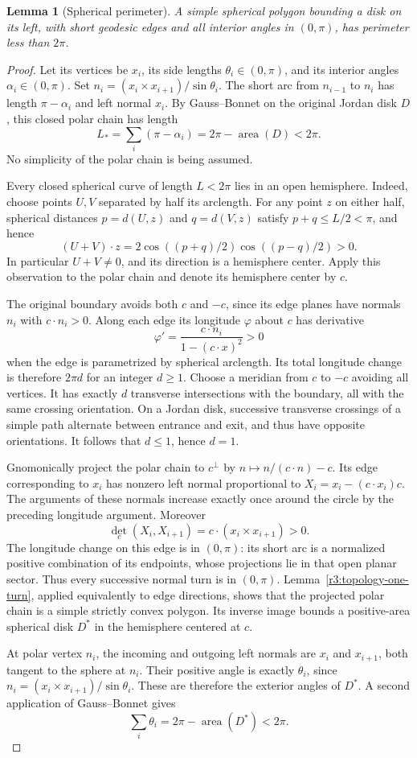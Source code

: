 \documentclass[12pt,reqno]{amsart}
\newtheorem{lemma}[theorem]{Lemma}
\theoremstyle{definition}
\numberwithin{equation}{section}
\begin{document}
\begin{lemma}[Spherical perimeter]
\label{r3:perimeter}
A simple spherical polygon bounding a disk on its left, with short
geodesic edges and all interior angles in $(0,\pi)$, has perimeter
less than $2\pi$.
\end{lemma}
\begin{proof}
Let its vertices be $x_i$, its side lengths $\theta_i\in(0,\pi)$,
and its interior angles $\alpha_i\in(0,\pi)$. Set
$n_i=(x_i\times x_{i+1})/\sin\theta_i$. The short arc from
$n_{i-1}$ to $n_i$ has length $\pi-\alpha_i$ and left normal $x_i$.
By Gauss--Bonnet on the original Jordan disk $D$, this closed polar
chain has length
\[
 L_*=\sum_i(\pi-\alpha_i)=2\pi-\operatorname{area}(D)<2\pi.
\]
No simplicity of the polar chain is being assumed.

Every closed spherical curve of length $L<2\pi$ lies in an open
hemisphere. Indeed, choose points $U,V$ separated by half its
arclength. For any point $z$ on either half, spherical distances
$p=d(U,z)$ and $q=d(V,z)$ satisfy $p+q\le L/2<\pi$, and hence
\[
 (U+V)\cdot z
 =2\cos((p+q)/2)\cos((p-q)/2)>0.
\]
In particular $U+V\ne0$, and its direction is a hemisphere center.
Apply this observation to the polar chain and denote its hemisphere
center by $c$.

The original boundary avoids both $c$ and $-c$, since its edge planes
have normals $n_i$ with $c\cdot n_i>0$. Along each edge its longitude
$\varphi$ about $c$ has derivative
\[
 \varphi'=\frac{c\cdot n_i}{1-(c\cdot x)^2}>0
\]
when the edge is parametrized by spherical arclength. Its total
longitude change is therefore $2\pi d$ for an integer $d\ge1$.
Choose a meridian from $c$ to $-c$ avoiding all vertices. It has
exactly $d$ transverse intersections with the boundary, all with the
same crossing orientation. On a Jordan disk, successive transverse
crossings of a simple path alternate between entrance and exit, and
thus have opposite orientations. It follows that $d\le1$, hence
$d=1$.

Gnomonically project the polar chain to $c^\perp$ by
$n\mapsto n/(c\cdot n)-c$. Its edge corresponding to $x_i$ has
nonzero left normal proportional to
$X_i=x_i-(c\cdot x_i)c$. The arguments of these normals increase
exactly once around the circle by the preceding longitude argument.
Moreover
\[
 \det_c(X_i,X_{i+1})
 =c\cdot(x_i\times x_{i+1})>0.
\]
The longitude change on this edge is in $(0,\pi)$: its short arc is
a normalized positive combination of its endpoints, whose projections
lie in that open planar sector. Thus every successive normal turn
is in $(0,\pi)$. Lemma~\ref{r3:topology-one-turn}, applied equivalently
to edge directions, shows that the projected polar chain is a simple
strictly convex polygon. Its inverse image bounds a positive-area
spherical disk $D^*$ in the hemisphere centered at $c$.

At polar vertex $n_i$, the incoming and outgoing left normals are
$x_i$ and $x_{i+1}$, both tangent to the sphere at $n_i$. Their
positive angle is exactly $\theta_i$, since
$n_i=(x_i\times x_{i+1})/\sin\theta_i$. These are therefore the
exterior angles of $D^*$. A second application of Gauss--Bonnet gives
\[
 \sum_i\theta_i=2\pi-\operatorname{area}(D^*)<2\pi.
\]
\end{proof}
\end{document}
